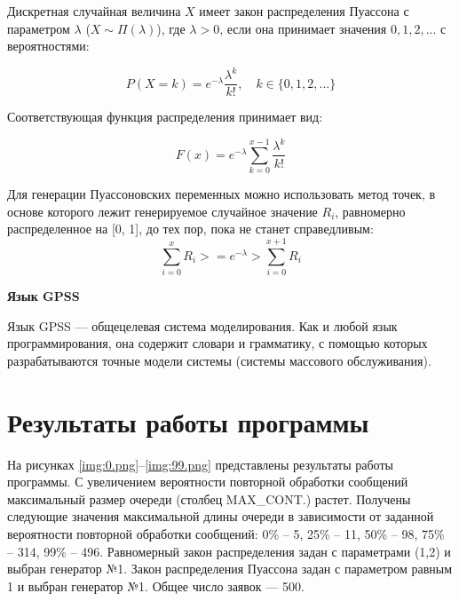 Дискретная случайная величина $X$ имеет закон распределения Пуассона с параметром $\lambda$ ($X \sim \Pi(\lambda)$), где $\lambda > 0$, если она принимает значения $0, 1, 2,...$ с вероятностями:

\begin{equation}
	P(X = k)= e^{-\lambda}\frac{\lambda^{k}}{k!}, \quad k \in \{0, 1, 2, ...\}
\end{equation}

Соответствующая функция распределения принимает вид:

\begin{equation}
	F(x) = e^{-\lambda}\sum_{k=0}^{x-1}\frac{\lambda^{k}}{k!} 
\end{equation}

Для генерации Пуассоновских переменных можно использовать метод точек, в основе
которого лежит генерируемое случайное значение $R_i$, равномерно распределенное на
[0, 1], до тех пор, пока не станет справедливым:
\begin{equation}
	\sum_{i=0}^{x}{R_i} >= e^{-\lambda} > \sum_{i=0}^{x + 1}{R_i}
\end{equation}

\textbf{Язык GPSS}

Язык GPSS — общецелевая система моделирования. Как и любой
язык программирования, она содержит словари и грамматику, с помощью
которых разрабатываются точные модели системы (системы массового обслуживания).

\section*{Результаты работы программы}

На рисунках \ref{img:0.png}--\ref{img:99.png} представлены результаты работы программы. С
увеличением вероятности повторной обработки сообщений максимальный
размер очереди (столбец MAX\_CONT.) растет. Получены следующие значения максимальной длины очереди в зависимости от заданной вероятности повторной обработки сообщений: 0\% -- 5, 25\% -- 11, 50\% -- 98, 75\% --
314, 99\% -- 496. Равномерный закон распределения задан с параметрами
(1,2) и выбран генератор №1. Закон распределения Пуассона задан с параметром равным 1 и выбран генератор №1. Общее число заявок — 500.






